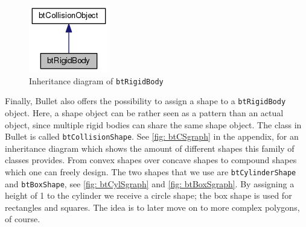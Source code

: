 \begin{figure}
\centering
\includegraphics[scale=0.5]{img/RigidBodies/btRigidBodyGraph.png}
\caption{Inheritance diagram of \texttt{btRigidBody}}
\label{fig: btRBgraph}
\end{figure}


Finally, Bullet also offers the possibility to assign a shape to a \texttt{btRigidBody} object. Here, a shape object can be rather seen as a pattern than an actual object, since multiple rigid bodies can share the same shape object. The class in Bullet is called \texttt{btCollisionShape}. See \autoref{fig: btCSgraph} in the appendix, for an inheritance diagram which shows the amount of different shapes this family of classes provides. From convex shapes over concave shapes to compound shapes which one can freely design. The two shapes that we use are \texttt{btCylinderShape} and \texttt{btBoxShape}, see \autoref{fig: btCylSgraph} and \autoref{fig: btBoxSgraph}. By assigning a height of 1 to the cylinder we receive a circle shape; the box shape is used for rectangles and squares. The idea is to later move on to more complex polygons, of course.
